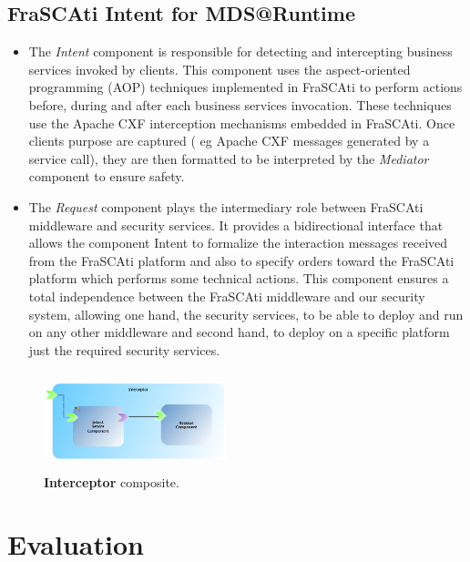 \documentclass[runningheads,a4paper]{llncs}
\begin{document}
\subsection{FraSCAti Intent for MDS@Runtime}
\begin{itemize}
\settowidth{\leftmargin}{{\Large$\square$}}\advance\leftmargin{}
\itemsep8pt\relax
\renewcommand\labelitemi{{\lower1.5pt\hbox{\Large$\square$}}}
\item The \emph{Intent} component is responsible for detecting and intercepting business services invoked  by clients. This component uses the aspect-oriented programming (AOP) techniques implemented in FraSCAti to perform actions before, during and after each business services invocation. These techniques use the Apache CXF interception mechanisms embedded in FraSCAti. Once clients purpose are captured ( eg Apache CXF messages generated by a service call), they are then formatted to be interpreted by the \emph{Mediator} component to ensure safety.
\item The \emph{Request} component plays the intermediary role between FraSCAti middleware and security services. It provides a bidirectional interface that allows the component Intent to formalize the interaction messages received from the FraSCAti platform and also to specify orders toward the FraSCAti platform which performs some technical actions. This component ensures a total independence between the FraSCAti middleware and our security system, allowing one hand, the security services,  to be able to deploy and run on any other middleware and second hand, to deploy on a specific platform just the required security services.
\end{itemize}
\begin{figure}[ht]  
\centering
\includegraphics[height=80pt, width=150pt]{interceptorComponent.png}
\caption{\textbf{Interceptor} composite.}
\label{fig:mdsAtRuntime}
\end{figure}

\section{Evaluation}
\end{document}
